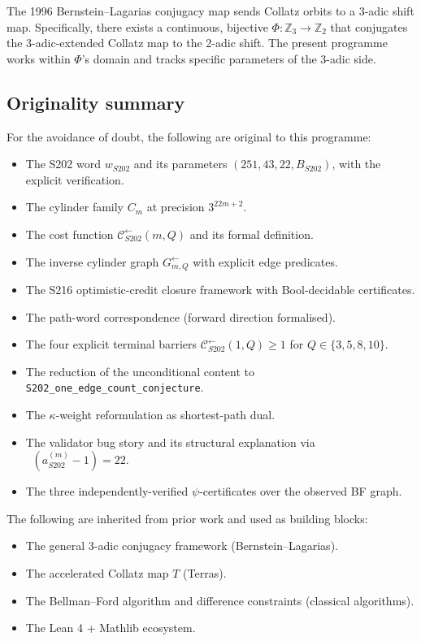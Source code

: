 \documentclass[11pt,a4paper]{article}
\theoremstyle{plain}
\theoremstyle{definition}
\newcommand{\Zp}[1]{\mathbb{Z}_{#1}}
\newcommand{\aSat}{a_{S202}^{(m)}}
\newcommand{\wS}{w_{S202}}
\newcommand{\Cback}{\mathcal{C}^{\!\leftarrow}_{S202}}
\newcommand{\InvG}{G^{\!\leftarrow}}
\DeclareMathOperator{\nuthree}{\nu_3}
\begin{document}
The 1996 Bernstein--Lagarias conjugacy map sends Collatz orbits
to a 3-adic shift map. Specifically, there exists a continuous,
bijective $\Phi : \Zp{3} \to \Zp{2}$ that conjugates the
3-adic-extended Collatz map to the 2-adic shift. The present
programme works within $\Phi$'s domain and tracks specific
parameters of the 3-adic side.

\subsection{Originality summary}

For the avoidance of doubt, the following are original to this
programme:
\begin{itemize}
   \item The S202 word $\wS$ and its parameters
         $(251, 43, 22, B_{S202})$, with the explicit
         verification.
   \item The cylinder family $C_m$ at precision $3^{22m + 2}$.
   \item The cost function $\Cback(m, Q)$ and its formal
         definition.
   \item The inverse cylinder graph $\InvG_{m, Q}$ with explicit
         edge predicates.
   \item The S216 optimistic-credit closure framework with
         Bool-decidable certificates.
   \item The path-word correspondence (forward direction
         formalised).
   \item The four explicit terminal barriers
         $\Cback(1, Q) \ge 1$ for $Q \in \{3, 5, 8, 10\}$.
   \item The reduction of the unconditional content to
         \texttt{S202\_one\_edge\_count\_conjecture}.
   \item The $\kappa$-weight reformulation as shortest-path
         dual.
   \item The validator bug story and its structural explanation
         via $\nuthree(\aSat - 1) = 22$.
   \item The three independently-verified $\psi$-certificates
         over the observed BF graph.
\end{itemize}

The following are inherited from prior work and used as
building blocks:
\begin{itemize}
   \item The general 3-adic conjugacy framework
         (Bernstein--Lagarias).
   \item The accelerated Collatz map $T$ (Terras).
   \item The Bellman--Ford algorithm and difference constraints
         (classical algorithms).
   \item The Lean 4 + Mathlib ecosystem.
\end{itemize}
\end{document}

